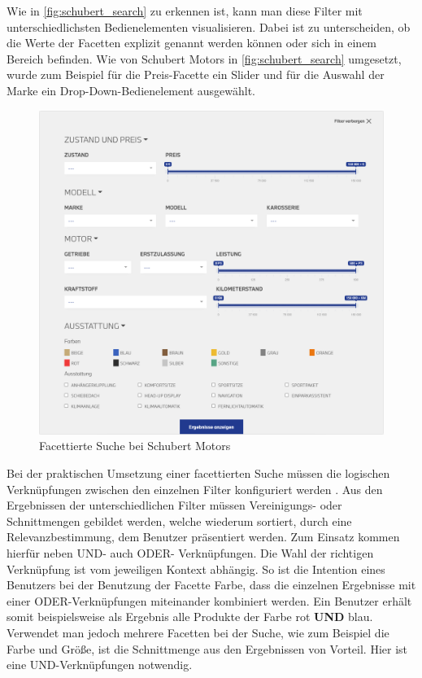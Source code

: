 Wie in \autoref{fig:schubert_search} zu erkennen ist, kann man diese Filter mit unterschiedlichsten Bedienelementen visualisieren. Dabei ist zu unterscheiden, ob die Werte der Facetten explizit genannt werden können oder sich in einem Bereich befinden. Wie von Schubert Motors \cite{SchubertMotorsGmbH.2021} in \autoref{fig:schubert_search} umgesetzt, wurde zum Beispiel für die Preis-Facette ein Slider und für die Auswahl der Marke ein Drop-Down-Bedienelement ausgewählt.

\begin{figure}[H]
    \centering
    \includegraphics[width=0.85\linewidth]{images/schubert_search.png}
    \caption{Facettierte Suche bei Schubert Motors \cite{SchubertMotorsGmbH.2021}}
    \label{fig:schubert_search}
\end{figure}

Bei der praktischen Umsetzung einer facettierten Suche müssen die logischen Verknüpfungen zwischen den einzelnen Filter konfiguriert werden \cite{Martin.2018}. Aus den Ergebnissen der unterschiedlichen Filter müssen Vereinigungs- oder Schnittmengen gebildet werden, welche wiederum sortiert, durch eine Relevanzbestimmung, dem Benutzer präsentiert werden. Zum Einsatz kommen hierfür neben \glqq UND\grqq{}- auch \glqq ODER\grqq{}- Verknüpfungen. Die Wahl der richtigen Verknüpfung ist vom jeweiligen Kontext abhängig. So ist die Intention eines Benutzers bei der Benutzung der Facette \glqq Farbe\grqq{}, dass die einzelnen Ergebnisse mit einer ODER-Verknüpfungen miteinander kombiniert werden. Ein Benutzer erhält somit beispielsweise als Ergebnis alle Produkte der Farbe rot \textbf{UND} blau. Verwendet man jedoch mehrere Facetten bei der Suche, wie zum Beispiel die \glqq Farbe\grqq{} und \glqq Größe\grqq{}, ist die Schnittmenge aus den Ergebnissen von Vorteil. Hier ist eine UND-Verknüpfungen notwendig.

